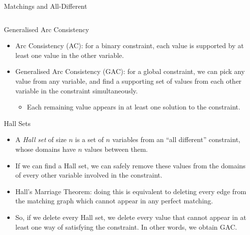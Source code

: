 \documentclass[aspectratio=169,compress,10pt]{beamer}
\begin{document}
\begin{frame}{Matchings and All-Different}
\begin{columns}
\begin{column}{0.22\textwidth}
        \end{column}
    \end{columns}
\end{frame}

\begin{frame}{Generalised Arc Consistency}
    \begin{itemize}
        \item Arc Consistency (AC): for a binary constraint, each value is supported by at least one
            value in the other variable.
        \item Generalised Arc Consistency (GAC): for a global constraint, we can pick any value from any
            variable, and find a supporting set of values from each other variable in the constraint
            simultaneously.
            \begin{itemize}
                \item Each remaining value appears in at least one solution to the constraint.
            \end{itemize}
    \end{itemize}
\end{frame}

\begin{frame}{Hall Sets}
    \begin{itemize}
        \item A \emph{Hall set} of size $n$ is a set of $n$ variables from an ``all different''
            constraint, whose domains have $n$ values between them.

        \item If we can find a Hall set, we can safely remove these values from the domains of every
            other variable involved in the constraint.

        \item Hall's Marriage Theorem: doing this is equivalent to deleting every edge from the
            matching graph which cannot appear in any perfect matching.

        \item So, if we delete every Hall set, we delete every value that cannot appear in at least
            one way of satisfying the constraint. In other words, we obtain GAC.
    \end{itemize}
\end{frame}
\end{document}
